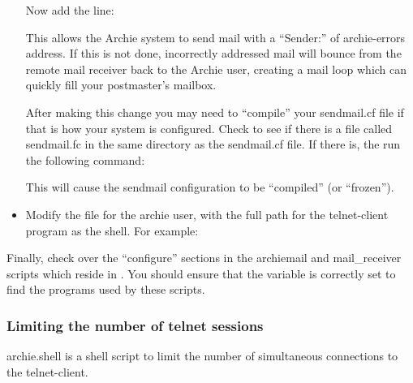 \begin{itemize}
\noindent Now add the line:


This allows the Archie system to send mail with a ``Sender:'' of archie-errors
address. If this is not done, incorrectly addressed mail will bounce from the
remote mail receiver back to the Archie user, creating a mail loop which can
quickly fill your postmaster's mailbox.

After making this change you may need to ``compile'' your sendmail.cf file if
that is how your system is configured. Check to see if there is a file called
sendmail.fc in the same directory as the sendmail.cf file. If there is, the
run the following command:





This will cause the sendmail configuration to be ``compiled'' (or ``frozen'').

\item
Modify the  file for the archie user, with the full path for the
telnet-client program as the shell. For example:

\end{itemize}



Finally, check over the ``configure'' sections in the archiemail and
mail\_receiver scripts which reside in . You should ensure that the
 variable is correctly set to find the programs used by these
scripts. 



\subsubsection{Limiting the number of telnet sessions}
\label{sec:limit}

archie.shell is a shell script to limit the number of simultaneous connections
to the telnet-client.

